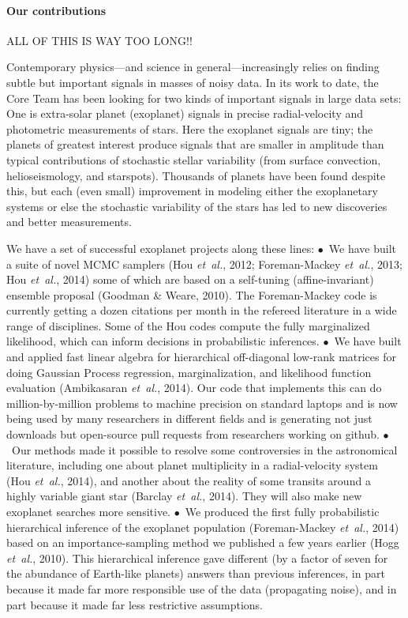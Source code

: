 \documentclass[12pt]{article}
\newcommand{\foreign}[1]{\textsl{#1}}
\newcommand{\etal}{\foreign{et~al.}}
\newcommand{\hoggitem}{$\bullet$}
\begin{document}
\paragraph{Our contributions}

ALL OF THIS IS WAY TOO LONG!!

Contemporary physics---and science in general---increasingly relies on
finding subtle but important signals in masses of noisy data.
In its work to date, the Core Team has been looking for two
kinds of important signals in large data sets:
One is extra-solar planet (exoplanet) signals in precise
radial-velocity and photometric measurements of stars.
Here the exoplanet signals are tiny; the planets of greatest interest
produce signals that are smaller in amplitude than typical
contributions of stochastic stellar variability (from surface
convection, helioseismology, and starspots).
Thousands of planets have been found despite this, but each (even
small) improvement in modeling either the exoplanetary systems or else
the stochastic variability of the stars has led to new discoveries and
better measurements.

We have a set of successful exoplanet projects along these lines:
\hoggitem~We have built a suite of novel MCMC samplers (Hou \etal,
2012; Foreman-Mackey \etal, 2013; Hou \etal, 2014) some of which are
based on a self-tuning (affine-invariant) ensemble proposal (Goodman
\& Weare, 2010).
The Foreman-Mackey code is currently getting a dozen citations per
month in the refereed literature in a wide range of disciplines.
Some of the Hou codes compute the fully marginalized likelihood, which
can inform decisions in probabilistic inferences.
\hoggitem~We have built and applied fast linear algebra for
hierarchical off-diagonal low-rank matrices for doing Gaussian Process
regression, marginalization, and likelihood function evaluation
(Ambikasaran \etal, 2014).
Our code that implements this can do million-by-million problems to
machine precision on standard laptops and is now being used by many
researchers in different fields and is generating not just downloads
but open-source pull requests from researchers working on github.
\hoggitem~Our methods made it possible to resolve some controversies
in the astronomical literature, including one about planet
multiplicity in a radial-velocity system (Hou \etal, 2014), and
another about the reality of some transits around a highly variable
giant star (Barclay \etal, 2014).
They will also make new exoplanet searches more sensitive.
\hoggitem~We produced the first fully probabilistic hierarchical
inference of the exoplanet population (Foreman-Mackey \etal, 2014)
based on an importance-sampling method we published a few years
earlier (Hogg \etal, 2010).
This hierarchical inference gave different (by a factor of seven for
the abundance of Earth-like planets) answers than previous inferences,
in part because it made far more responsible use of the data
(propagating noise), and in part because it made far less restrictive
assumptions.
\end{document}
